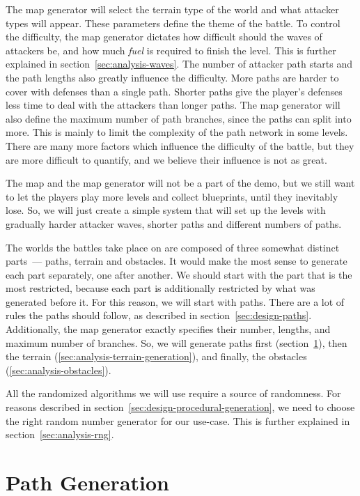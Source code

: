 The map generator will select the terrain type of the world and what attacker types will appear.
These parameters define the theme of the battle.
To control the difficulty, the map generator dictates how difficult should the waves of attackers be, and how much \emph{fuel} is required to finish the level.
This is further explained in section~\ref{sec:analysis-waves}.
The number of attacker path starts and the path lengths also greatly influence the difficulty.
More paths are harder to cover with defenses than a single path.
Shorter paths give the player's defenses less time to deal with the attackers than longer paths.
The map generator will also define the maximum number of path branches, since the paths can split into more.
This is mainly to limit the complexity of the path network in some levels.
There are many more factors which influence the difficulty of the battle, but they are more difficult to quantify, and we believe their influence is not as great.

\pagebreak

The map and the map generator will not be a part of the demo, but we still want to let the players play more levels and collect blueprints, until they inevitably lose.
So, we will just create a simple system that will set up the levels with gradually harder attacker waves, shorter paths and different numbers of paths.

The worlds the battles take place on are composed of three somewhat distinct parts~--- paths, terrain and obstacles.
It would make the most sense to generate each part separately, one after another.
We should start with the part that is the most restricted, because each part is additionally restricted by what was generated before it.
For this reason, we will start with paths.
There are a lot of rules the paths should follow, as described in section~\ref{sec:design-paths}.
Additionally, the map generator exactly specifies their number, lengths, and maximum number of branches.
So, we will generate paths first (section~\ref{sec:analysis-path-generation}), then the terrain (\ref{sec:analysis-terrain-generation}), and finally, the obstacles (\ref{sec:analysis-obstacles}).

All the randomized algorithms we will use require a source of randomness.
For reasons described in section~\ref{sec:design-procedural-generation}, we need to choose the right random number generator for our use-case.
This is further explained in section~\ref{sec:analysis-rng}.

\section{Path Generation}\label{sec:analysis-path-generation}


